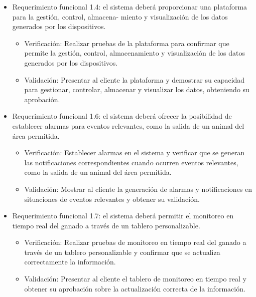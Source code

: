 \documentclass[
11pt, %
]{charter}
\begin{document}
\begin{itemize}
\item Requerimiento funcional 1.4: el sistema deberá proporcionar una plataforma para la gestión, control, almacena-
miento y visualización de los datos generados por los dispositivos.
\begin{itemize}
\item Verificación: Realizar pruebas de la plataforma para confirmar que permite la gestión, control, almacenamiento y visualización de los datos generados por los dispositivos.
\item Validación: Presentar al cliente la plataforma y demostrar su capacidad para gestionar, controlar, almacenar y visualizar los datos, obteniendo su aprobación.
\end{itemize}
\end{itemize}

\begin{itemize}
\item Requerimiento funcional 1.6: el sistema deberá ofrecer la posibilidad de establecer alarmas para eventos relevantes,
como la salida de un animal del área permitida.
\begin{itemize}
\item Verificación: Establecer alarmas en el sistema y verificar que se generan las notificaciones correspondientes cuando ocurren eventos relevantes, como la salida de un animal del área permitida.
\item Validación: Mostrar al cliente la generación de alarmas y notificaciones en situaciones de eventos relevantes y obtener su validación.
\end{itemize}
\end{itemize}

\begin{itemize}
\item Requerimiento funcional 1.7: el sistema deberá permitir el monitoreo en tiempo real del ganado a través de un
tablero personalizable.
\begin{itemize}
\item Verificación: Realizar pruebas de monitoreo en tiempo real del ganado a través de un tablero personalizable y confirmar que se actualiza correctamente la información.
\item Validación: Presentar al cliente el tablero de monitoreo en tiempo real y obtener su aprobación sobre la actualización correcta de la información.
\end{itemize}
\end{itemize}
\end{document}
